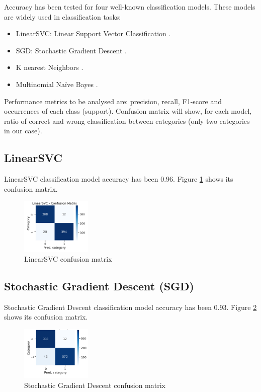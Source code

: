 Accuracy has been tested for four well-known classification models. These models are widely used in classification tasks:
\begin{itemize}
    \item LinearSVC: Linear Support Vector Classification \cite{hsu2003practical}.
    \item SGD: Stochastic Gradient Descent \cite{ketkar2017stochastic}.
    \item K nearest Neighbors \cite{kozma2008k}.
    \item Multinomial Naïve Bayes \cite{kibriya2004multinomial}.
\end{itemize}

Performance metrics to be analysed are: precision, recall, F1-score and occurrences of each class (support). Confusion matrix will show, for each model, ratio of correct and wrong classification between categories (only two categories in our case).

\subsection{LinearSVC}
\label{sec:LinearSVC}

LinearSVC classification model accuracy has been 0.96. Figure \ref{fig:LinearSVC_cfm} shows its confusion matrix.
\begin{figure}[H]
	\centering
	\includegraphics[width=0.3\textwidth]{figs/LinearSVC_cfm.png}
	\caption{LinearSVC confusion matrix}
	\label{fig:LinearSVC_cfm}
\end{figure}

\subsection{Stochastic Gradient Descent (SGD)}

Stochastic Gradient Descent classification model accuracy has been 0.93. Figure \ref{fig:sgd_cfm} shows its confusion matrix.
\begin{figure}[H]
	\centering
	\includegraphics[width=0.3\textwidth]{figs/sgd_cfm.png}
	\caption{Stochastic Gradient Descent confusion matrix}
	\label{fig:sgd_cfm}
\end{figure}

